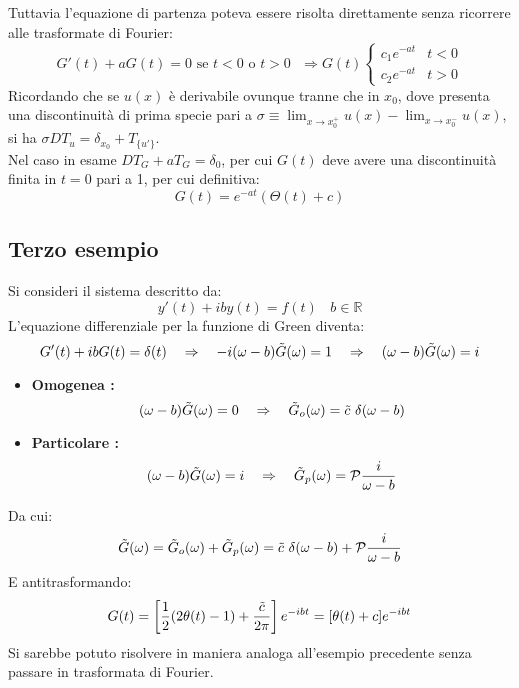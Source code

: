 \documentclass[twoside]{article}
\begin{document}
Tuttavia l'equazione di partenza poteva essere risolta direttamente senza ricorrere alle trasformate di Fourier:
\begin{equation}
    G'(t)+aG(t)=0 \text{ se $t<0$ o $t>0$ } \Longrightarrow
    G(t)\begin{cases}
    c_1e^{-at} & t<0\\
    c_2e^{-at} & t>0
    \end{cases}
\end{equation}
Ricordando che se $u(x)$ è derivabile ovunque tranne che in $x_0$, dove presenta una discontinuità di prima specie pari a $\sigma\equiv \lim_{x\to x_0^+}u(x)-\lim_{x\to x_0^-}u(x)$, si ha $\sigma DT_u=\delta_{x_0}+T_{\{u'\}}$.\\
Nel caso in esame $DT_G+aT_G=\delta_0$, per cui $G(t)$ deve avere una discontinuità finita in $t=0$ pari a 1, per cui definitiva:
\begin{equation}
    G(t)=e^{-at}(\Theta(t)+c)
\end{equation}

\subsection{Terzo esempio}
Si consideri il sistema descritto da:
\begin{equation}
    y'(t)+iby(t)=f(t) \ \ \ \ b \in \mathds{R}
\end{equation}
L'equazione differenziale per la funzione di Green diventa:
\begin{equation}
    G'(t)+ibG(t)=\delta(t) \ \ \ \Rightarrow \ \ \ -i(\omega - b)\Tilde{G}(\omega)=1 \ \ \ \Rightarrow \ \ \ (\omega-b)\Tilde{G}(\omega)=i
\end{equation}
\begin{itemize}
    \item \textbf{Omogenea :}
    \begin{equation}
        (\omega-b)\Tilde{G}(\omega)=0 \ \ \ \Rightarrow \ \ \ \Tilde{G}_o(\omega)=\Tilde{c}\ \delta(\omega -b)
    \end{equation}
    \item\textbf{Particolare :}
    \begin{equation}
        (\omega-b)\Tilde{G}(\omega)=i \ \ \ \Rightarrow \ \ \ \Tilde{G}_p(\omega)=\mathcal{P}\frac{i}{\omega - b}
    \end{equation}
\end{itemize}
Da cui:
\begin{equation}
    \Tilde{G}(\omega)=\Tilde{G}_o(\omega) + \Tilde{G}_p(\omega)=\Tilde{c}\ \delta(\omega -b) + \mathcal{P}\frac{i}{\omega - b}
\end{equation}
E antitrasformando:
\begin{equation}
    G(t)=\left[ \frac{1}{2}(2\theta(t)-1)+\frac{\Tilde{c}}{2\pi} \right]e^{-ibt}=[\theta(t)+c]e^{-ibt}
\end{equation}
Si sarebbe potuto risolvere in maniera analoga all'esempio precedente senza passare in trasformata di Fourier.
\end{document}
